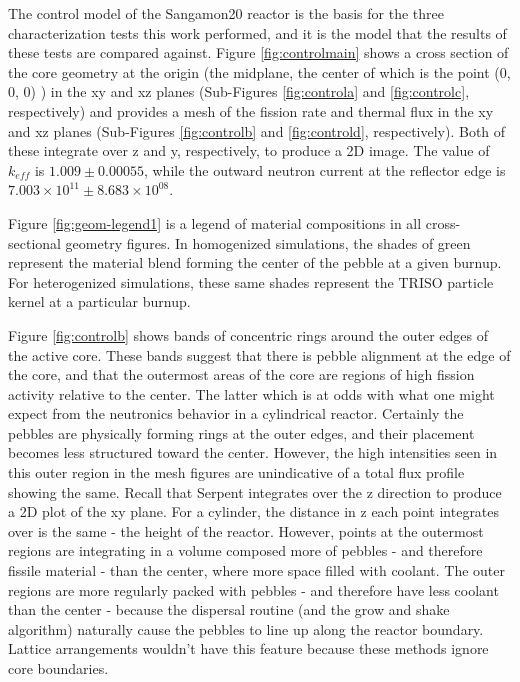 The control model of the Sangamon20 reactor is the basis for the three characterization tests this work performed, and it is the model that the results of these tests are compared against.  Figure \ref{fig:controlmain} shows a cross section of the core geometry at the origin (the midplane, the center of which is the point (0, 0, 0) ) in the xy and xz planes (Sub-Figures \ref{fig:controla} and \ref{fig:controlc}, respectively) and provides a mesh of the fission rate and thermal flux in the xy and xz planes (Sub-Figures \ref{fig:controlb} and \ref{fig:controld}, respectively).  Both of these integrate over z and y, respectively, to produce a 2D image.  The value of $k_{eff}$ is $1.009 \pm 0.00055$, while the outward neutron current at the reflector edge is $7.003\times 10^{11} \pm 8.683\times 10^{08}$.

Figure \ref{fig:geom-legend1} is a legend of material compositions in all cross-sectional geometry figures.  In homogenized simulations, the shades of green represent the material blend forming the center of the pebble at a given burnup.  For heterogenized simulations, these same shades represent the TRISO particle kernel at a particular burnup.



Figure \ref{fig:controlb} shows bands of concentric rings around the outer edges of the active core.  These bands suggest that there is pebble alignment at the edge of the core, and that the outermost areas of the core are regions of high fission activity relative to the center.  The latter which is at odds with what one might expect from the neutronics behavior in a cylindrical reactor.  Certainly the pebbles are physically forming rings at the outer edges, and their placement becomes less structured toward the center.  However, the high intensities seen in this outer region in the mesh figures are unindicative of a total flux profile showing the same.  Recall that Serpent integrates over the z direction to produce a 2D plot of the xy plane.  For a cylinder, the distance in z each point integrates over is the same - the height of the reactor.  However, points at the outermost regions are integrating in a volume composed more of pebbles - and therefore fissile material - than the center, where more space filled with coolant.  The outer regions are more regularly packed with pebbles - and therefore have less coolant than the center - because the dispersal routine (and the grow and shake algorithm) naturally cause the pebbles to line up along the reactor boundary.  Lattice arrangements wouldn't have this feature because these methods ignore core boundaries.

